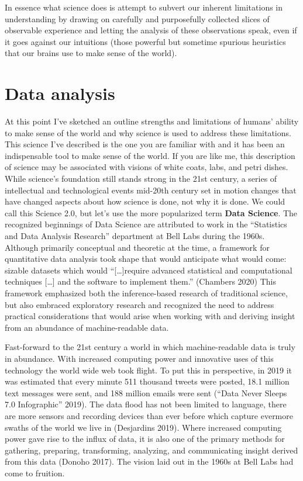 \documentclass[
  letterpaper,
]{latex/krantz}
\begin{document}
In essence what science does is attempt to subvert our inherent
limitations in understanding by drawing on carefully and purposefully
collected slices of observable experience and letting the analysis of
these observations speak, even if it goes against our intuitions (those
powerful but sometime spurious heuristics that our brains use to make
sense of the world).

\hypertarget{data-analysis}{%
\section{Data analysis}\label{data-analysis}}

At this point I've sketched an outline strengths and limitations of
humans' ability to make sense of the world and why science is used to
address these limitations. This science I've described is the one you
are familiar with and it has been an indispensable tool to make sense of
the world. If you are like me, this description of science may be
associated with visions of white coats, labs, and petri dishes. While
science's foundation still stands strong in the 21st century, a series
of intellectual and technological events mid-20th century set in motion
changes that have changed aspects about how science is done, not why it
is done. We could call this Science 2.0, but let's use the more
popularized term \textbf{Data Science}. The
recognized beginnings of Data Science are attributed to work in the
``Statistics and Data Analysis Research'' department at Bell Labs during
the 1960s. Although primarily conceptual and theoretic at the time, a
framework for quantitative data analysis took shape that would
anticipate what would come: sizable datasets which would
``{[}\ldots{]}require advanced statistical and computational techniques
{[}\ldots{]} and the software to implement them.'' (Chambers 2020) This
framework emphasized both the inference-based research of traditional
science, but also embraced exploratory research and recognized the need
to address practical considerations that would arise when working with
and deriving insight from an abundance of machine-readable data.

Fast-forward to the 21st century a world in which machine-readable data
is truly in abundance. With increased computing power and innovative
uses of this technology the world wide web took flight. To put this in
perspective, in 2019 it was estimated that every minute 511 thousand
tweets were posted, 18.1 million text messages were sent, and 188
million emails were sent ({``Data Never Sleeps 7.0 Infographic''} 2019).
The data flood has not been limited to language, there are more sensors
and recording devices than ever before which capture evermore swaths of
the world we live in (Desjardins 2019). Where increased computing power
gave rise to the influx of data, it is also one of the primary methods
for gathering, preparing, transforming, analyzing, and communicating
insight derived from this data (Donoho 2017). The vision laid out in the
1960s at Bell Labs had come to fruition.
\end{document}
